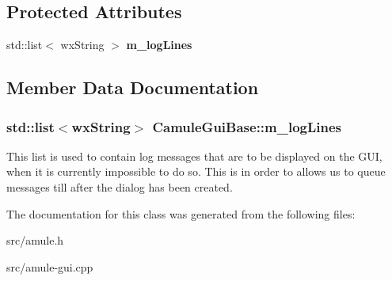 \subsection*{Protected Attributes}
\begin{DoxyCompactItemize}
\item 
std::list$<$ wxString $>$ {\bf m\_\-logLines}
\end{DoxyCompactItemize}


\subsection{Member Data Documentation}
\subsubsection[{m\_\-logLines}]{\setlength{\rightskip}{0pt plus 5cm}std::list$<$wxString$>$ {\bf CamuleGuiBase::m\_\-logLines}\hspace{0.3cm}{\ttfamily  [protected]}}\label{classCamuleGuiBase_a35a52ab89e4840022f4806850672ff15}


This list is used to contain log messages that are to be displayed on the GUI, when it is currently impossible to do so. This is in order to allows us to queue messages till after the dialog has been created. 

The documentation for this class was generated from the following files:\begin{DoxyCompactItemize}
\item 
src/amule.h\item 
src/amule-\/gui.cpp\end{DoxyCompactItemize}
